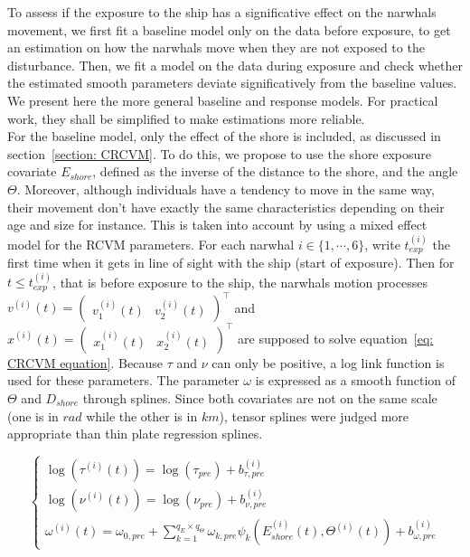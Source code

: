 \documentclass[11pt]{article}
\newcommand {\1}{\mathbb{1}}
\begin{document}
To assess if the exposure to the ship has a significative effect on the narwhals movement, we first fit a baseline model only on the data before exposure, to get an estimation on how the narwhals move when they are not exposed to the disturbance. Then, we fit a model on the data during exposure and check whether the estimated smooth parameters deviate significatively from the baseline values. We present here the more general baseline and response models. For practical work, they shall be simplified to make estimations more reliable.\\

For the baseline model, only the effect of the shore is included, as discussed in section~\ref{section: CRCVM}. To do this, we propose to use the shore exposure covariate $E_{shore}$, defined as the inverse of the distance to the shore, and the angle $\Theta$.
Moreover, although individuals have a tendency to move in the same way, their movement don't have exactly the same characteristics depending on their age and size for instance. This is taken into account by using a mixed effect model for the RCVM parameters.
For each narwhal $i \in \{1, \cdots, 6\}$, write $t_{exp}^{(i)}$ the first time when it gets in line of sight with the ship (start of exposure). Then for $t \leq t_{exp}^{(i)}$, that is before exposure to the ship, the narwhals motion processes $v^{(i)}(t)=\begin{pmatrix} v^{(i)}_1(t) & v^{(i)}_2(t) \end{pmatrix}^\top$ and $x^{(i)}(t)=\begin{pmatrix} x^{(i)}_1(t) & x^{(i)}_2(t) \end{pmatrix}^\top$ are supposed to solve equation~\ref{eq: CRCVM equation}. Because $\tau$ and $\nu$ can only be positive, a log link function is used for these parameters. The parameter $\omega$ is expressed as a smooth function of $\Theta$ and $D_{shore}$ through splines. Since both covariates are not on the same scale (one is in $rad$ while the other is in $km$), tensor splines were judged more appropriate than thin plate regression splines.

\begin{equation} 
	\left\{
	\begin{array}{l}
	
			\log(\tau^{(i)}(t))=\log(\tau_{pre})+b_{\tau,pre}^{(i)} \\
			\log(\nu^{(i)}(t))=\log(\nu_{pre})+b_{\nu,pre}^{(i)}  \\
			\omega^{(i)}(t)=\omega_{0,pre}+\sum_{k=1}^{q_E \times q_{\Theta}} \omega_{k,pre} \psi_k(E_{shore}^{(i)}(t),\Theta^{(i)}(t)) + b_{\omega,pre}^{(i)}
	\end{array}
	\right.
	\label{eq: baseline model}
\end{equation}
\end{document}
